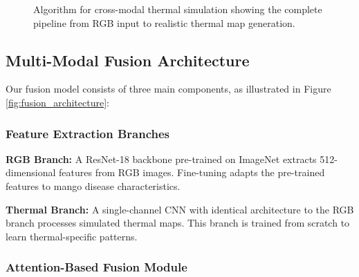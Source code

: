 \documentclass[conference]{IEEEtran}
\begin{document}
\begin{figure}[htbp]
\centering
{}
\caption{Algorithm for cross-modal thermal simulation showing the complete pipeline from RGB input to realistic thermal map generation.}
\label{alg:thermal_simulation}
\end{figure}

\subsection{Multi-Modal Fusion Architecture}

Our fusion model consists of three main components, as illustrated in Figure \ref{fig:fusion_architecture}:

\subsubsection{Feature Extraction Branches}

\textbf{RGB Branch:} A ResNet-18 backbone pre-trained on ImageNet extracts 512-dimensional features from RGB images. Fine-tuning adapts the pre-trained features to mango disease characteristics.

\textbf{Thermal Branch:} A single-channel CNN with identical architecture to the RGB branch processes simulated thermal maps. This branch is trained from scratch to learn thermal-specific patterns.

\subsubsection{Attention-Based Fusion Module}
\end{document}
